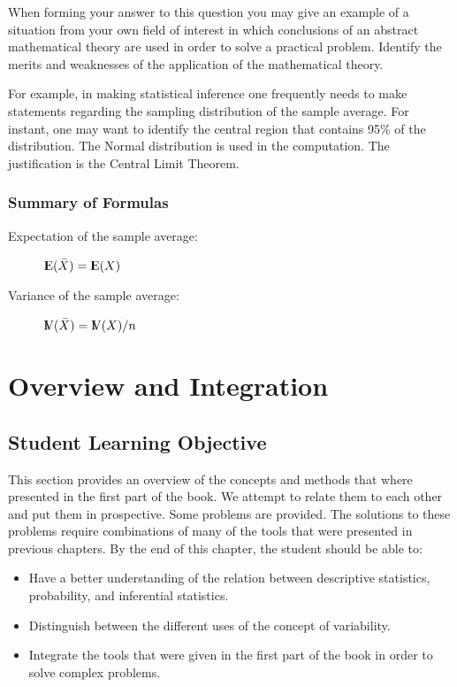 \documentclass[]{krantz}
\newcommand{\Expec}{{\rm I\kern-.3em E}}
\newcommand{\Var}{{\rm I\kern-.3em V}}
\theoremstyle{definition}
\theoremstyle{definition}
\theoremstyle{definition}
\theoremstyle{remark}
\begin{document}
When forming your answer to this question you may give an example of a
situation from your own field of interest in which conclusions of an
abstract mathematical theory are used in order to solve a practical
problem. Identify the merits and weaknesses of the application of the
mathematical theory.

For example, in making statistical inference one frequently needs to
make statements regarding the sampling distribution of the sample
average. For instant, one may want to identify the central region that
contains 95\% of the distribution. The Normal distribution is used in
the computation. The justification is the Central Limit Theorem.

\subsection*{Summary of Formulas}\label{summary-of-formulas}


\begin{description}
\item[Expectation of the sample average:]
\(\Expec(\bar X) = \Expec(X)\)
\item[Variance of the sample average:]
\(\Var(\bar X) = \Var(X)/n\)
\end{description}

\chapter{Overview and Integration}\label{overview-and-integration}

\section{Student Learning Objective}\label{student-learning-objective-4}

This section provides an overview of the concepts and methods that where
presented in the first part of the book. We attempt to relate them to
each other and put them in prospective. Some problems are provided. The
solutions to these problems require combinations of many of the tools
that were presented in previous chapters. By the end of this chapter,
the student should be able to:

\begin{itemize}
\item
  Have a better understanding of the relation between descriptive
  statistics, probability, and inferential statistics.
\item
  Distinguish between the different uses of the concept of variability.
\item
  Integrate the tools that were given in the first part of the book in
  order to solve complex problems.
\end{itemize}
\end{document}
